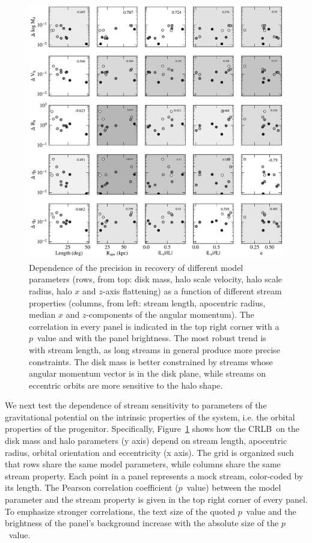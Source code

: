 \documentclass[modern]{aastex61}
\newcommand{\acronym}[1]{{\small{#1}}}
\newcommand{\CRLB}{\acronym{CRLB}}
\begin{document}
\begin{figure}
\begin{center}
\includegraphics[width=\textwidth]{orbit_correlations.pdf}
\caption{Dependence of the precision in recovery of different model parameters (rows, from top: disk mass, halo scale velocity, halo scale radius, halo $x$ and $z$-axis flattening) as a function of different stream properties (columns, from left: stream length, apocentric radius, median $x$ and $z$-components of the angular momentum).
The correlation in every panel is indicated in the top right corner with a $p$~value and with the panel brightness.
The most robust trend is with stream length, as long streams in general produce more precise constraints.
The disk mass is better constrained by streams whose angular momentum vector is in the disk plane, while streams on eccentric orbits are more sensitive to the halo shape.}
\label{fig:orbit_correlations}
\end{center}
\end{figure}

We next test the dependence of stream sensitivity to parameters of the gravitational potential on the intrinsic properties of the system, i.e. the orbital properties of the progenitor.
Specifically, Figure~\ref{fig:orbit_correlations} shows how the \CRLB\ on the disk mass and halo parameters (y axis) depend on stream length, apocentric radius, orbital orientation and eccentricity (x axis).
The grid is organized such that rows share the same model parameters, while columns share the same stream property.
Each point in a panel represents a mock stream, color-coded by its length.
The Pearson correlation coefficient ($p$~value) between the model parameter and the stream property is given in the top right corner of every panel.
To emphasize stronger correlations, the text size of the quoted $p$~value and the brightness of the panel's background increase with the absolute size of the $p$~value.
\end{document}
